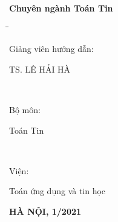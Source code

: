 \documentclass[a4paper, 12pt]{report}
\begin{document}
\begin{titlepage}
\begin{center}
				\vspace{1cm}
				\fontsize{14pt}{17pt}
				\textbf{Chuyên ngành Toán Tin}
				\vspace{2cm}

				\begin{tabbing}
		\hspace{5cm}\=\hspace{5cm}\=\hspace{5cm} 
		\kill{\it }\>{\it}\\				
		\begin{bfseries}\fontsize{13pt}{0.15cm}\hspace{2cm} Giảng viên hướng dẫn:\end{bfseries}\> \begin{bfseries}\fontsize{13pt}{0.15cm} \hspace{2.3cm} TS.  LÊ HẢI HÀ\end{bfseries}\>\\
		\begin{bfseries}\fontsize{13pt}{0.15cm}\hspace{2cm} Bộ môn:\end{bfseries}\> 
		\begin{bfseries}\fontsize{13pt}{0.15cm}\hspace{2.5cm} Toán Tin\end{bfseries}\>\\
		\begin{bfseries}\fontsize{13pt}{0.15cm}\hspace{2cm} Viện:\end{bfseries}\> 
		\begin{bfseries}\fontsize{13pt}{0.15cm}\hspace{2.5cm} Toán ứng dụng và tin học\end{bfseries}\>
	\end{tabbing}
%					
%					
%					
%					
				
				\vfill
				
				{\bf HÀ NỘI, 1/2021}
				
			\end{center}
			
	\end{titlepage}
\end{document}

